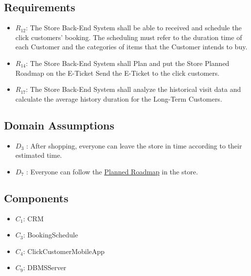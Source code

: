 \documentclass[a4paper,12pt]{report}
\begin{document}
\subsection{Requirements}

\begin{itemize}
	\item $R_{12}$: The Store Back-End System shall be able to received and schedule the click customers' booking. The scheduling must refer to the duration time of each Customer and the categories of items that the Customer intends to buy.
	\item $R_{14}$: The Store Back-End System shall Plan and put the Store Planned Roadmap on the E-Ticket Send the E-Ticket to the click customers.
	\item $R_{17}$: The Store Back-End System shall analyze the historical visit data and calculate the average history duration for the Long-Term Customers.
\end{itemize}

\subsection{Domain Assumptions}

\begin{itemize}
	\item $D_3$ : After shopping, everyone can leave the store in time according to their estimated time.
	\item $D_7$ : Everyone can follow the \hyperref[Definitions]{Planned Roadmap} in the store.
\end{itemize}

\subsection{Components}

\begin{itemize}
	\item $C_1$: CRM
	\item $C_3$: BookingSchedule
	\item $C_4$: ClickCustomerMobileApp
	\item $C_{9}$: DBMSServer
\end{itemize}



%		
%
\end{document}
